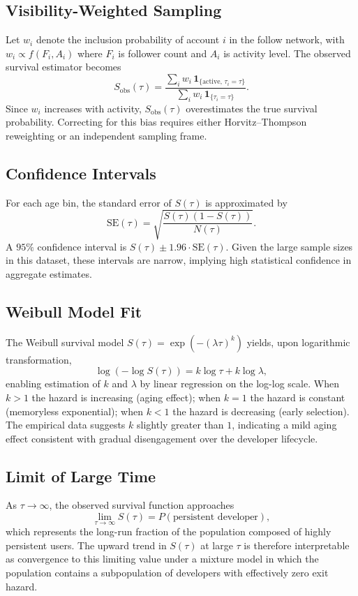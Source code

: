 \documentclass[12pt,a4paper]{article}
\begin{document}
\subsection{Visibility-Weighted Sampling}

Let $w_i$ denote the inclusion probability of account $i$ in the follow network, with $w_i \propto f(F_i, A_i)$ where $F_i$ is follower count and $A_i$ is activity level. The observed survival estimator becomes
\[
S_{\text{obs}}(\tau) = \frac{\sum_i w_i \,\mathbf{1}_{\{\text{active},\, \tau_i = \tau\}}}{\sum_i w_i \,\mathbf{1}_{\{\tau_i = \tau\}}}.
\]
Since $w_i$ increases with activity, $S_{\text{obs}}(\tau)$ overestimates the true survival probability. Correcting for this bias requires either Horvitz--Thompson reweighting or an independent sampling frame.

\subsection{Confidence Intervals}

For each age bin, the standard error of $S(\tau)$ is approximated by
\[
\mathrm{SE}(\tau) = \sqrt{\frac{S(\tau)(1 - S(\tau))}{N(\tau)}}.
\]
A $95\%$ confidence interval is $S(\tau) \pm 1.96 \cdot \mathrm{SE}(\tau)$. Given the large sample sizes in this dataset, these intervals are narrow, implying high statistical confidence in aggregate estimates.

\subsection{Weibull Model Fit}

The Weibull survival model $S(\tau) = \exp(-(\lambda \tau)^k)$ yields, upon logarithmic transformation,
\[
\log(-\log S(\tau)) = k \log \tau + k \log \lambda,
\]
enabling estimation of $k$ and $\lambda$ by linear regression on the log-log scale. When $k > 1$ the hazard is increasing (aging effect); when $k = 1$ the hazard is constant (memoryless exponential); when $k < 1$ the hazard is decreasing (early selection). The empirical data suggests $k$ slightly greater than $1$, indicating a mild aging effect consistent with gradual disengagement over the developer lifecycle.

\subsection{Limit of Large Time}

As $\tau \to \infty$, the observed survival function approaches
\[
\lim_{\tau \to \infty} S(\tau) = P(\text{persistent developer}),
\]
which represents the long-run fraction of the population composed of highly persistent users. The upward trend in $S(\tau)$ at large $\tau$ is therefore interpretable as convergence to this limiting value under a mixture model in which the population contains a subpopulation of developers with effectively zero exit hazard.
\end{document}
